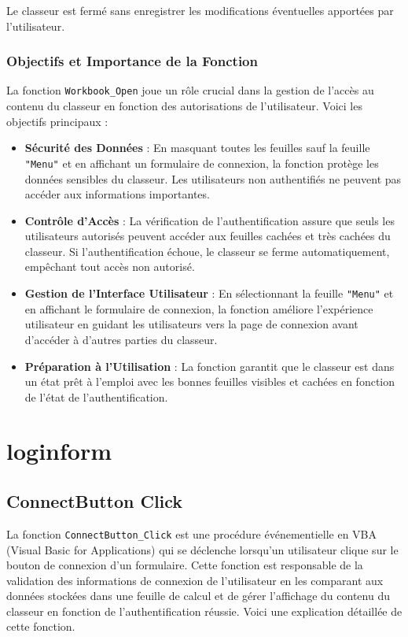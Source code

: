 \documentclass[a4paper, oneside, 12pt, final]{extreport}
\begin{document}
Le classeur est fermé sans enregistrer les modifications éventuelles apportées par l'utilisateur.

\subsubsection{Objectifs et Importance de la Fonction}

La fonction \texttt{Workbook\_Open} joue un rôle crucial dans la gestion de l'accès au contenu du classeur en fonction des autorisations de l'utilisateur. Voici les objectifs principaux :

\begin{itemize}
    \item \textbf{Sécurité des Données} : En masquant toutes les feuilles sauf la feuille \texttt{"Menu"} et en affichant un formulaire de connexion, la fonction protège les données sensibles du classeur. Les utilisateurs non authentifiés ne peuvent pas accéder aux informations importantes.
    \item \textbf{Contrôle d'Accès} : La vérification de l'authentification assure que seuls les utilisateurs autorisés peuvent accéder aux feuilles cachées et très cachées du classeur. Si l'authentification échoue, le classeur se ferme automatiquement, empêchant tout accès non autorisé.
    \item \textbf{Gestion de l'Interface Utilisateur} : En sélectionnant la feuille \texttt{"Menu"} et en affichant le formulaire de connexion, la fonction améliore l'expérience utilisateur en guidant les utilisateurs vers la page de connexion avant d'accéder à d'autres parties du classeur.
    \item \textbf{Préparation à l'Utilisation} : La fonction garantit que le classeur est dans un état prêt à l'emploi avec les bonnes feuilles visibles et cachées en fonction de l'état de l'authentification.
\end{itemize}
\section{loginform}
\subsection{ConnectButton Click}

La fonction \texttt{ConnectButton\_Click} est une procédure événementielle en VBA (Visual Basic for Applications) qui se déclenche lorsqu'un utilisateur clique sur le bouton de connexion d'un formulaire. Cette fonction est responsable de la validation des informations de connexion de l'utilisateur en les comparant aux données stockées dans une feuille de calcul et de gérer l'affichage du contenu du classeur en fonction de l'authentification réussie. Voici une explication détaillée de cette fonction.
\end{document}
